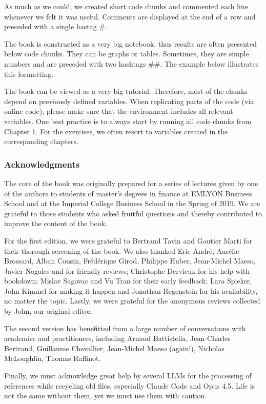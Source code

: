 As much as we could, we created short code chunks and commented each line whenever we felt it was useful. Comments are displayed at the end of a row and preceded with a single hastag \#.

The book is constructed as a very big notebook, thus results are often presented below code chunks. They can be graphs or tables. Sometimes, they are simple numbers and are preceded with two hashtags \#\#. The example below illustrates this formatting.

The book can be viewed as a very big tutorial. Therefore, most of the chunks depend on previously defined variables. When replicating parts of the code (via online code), please make sure that the environment includes all relevant variables. One best practice is to always start by running all code chunks from Chapter 1. For the exercises, we often resort to variables created in the corresponding chapters.

\subsubsection{Acknowledgments}

The core of the book was originally prepared for a series of lectures given by one of the authors to students of master's degrees in finance at EMLYON Business School and at the Imperial College Business School in the Spring of 2019. We are grateful to those students who asked fruitful questions and thereby contributed to improve the content of the book.

For the first edition, we were grateful to Bertrand Tavin and Gautier Marti for their thorough screening of the book. We also thanked Eric André, Aurélie Brossard, Alban Cousin, Frédérique Girod, Philippe Huber, Jean-Michel Maeso, Javier Nogales and for friendly reviews; Christophe Dervieux for his help with bookdown; Mislav Sagovac and Vu Tran for their early feedback; Lara Spieker, John Kimmel for making it happen and Jonathan Regenstein for his availability, no matter the topic. Lastly, we were grateful for the anonymous reviews collected by John, our original editor.

The second version has benefitted from a large number of conversations with academics and practitioners, including Arnaud Battistella, Jean-Charles Bertrand, Guillaume Chevallier, Jean-Michel Maeso (again!), Nicholas McLoughlin, Thomas Raffinot.

Finally, we must acknowledge great help by several LLMs for the processing of references while recycling old files, especially Claude Code and Opus 4.5. Life is not the same without them, yet we must use them with caution.
